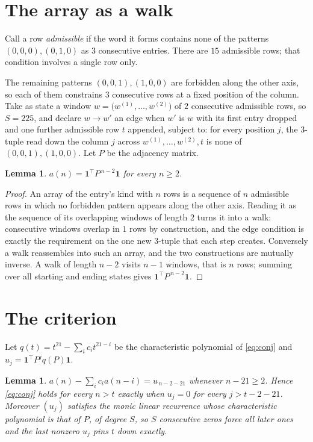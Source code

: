 \documentclass[11pt,a4paper]{article}
\theoremstyle{plain}
\newtheorem{lemma}[theorem]{Lemma}
\theoremstyle{definition}
\begin{document}
\section{The array as a walk}

Call a row \emph{admissible} if the word it forms contains none of the patterns
$(0,0,0), (0,1,0)$ as $3$ consecutive entries. There are $15$ admissible rows; that condition
involves a single row only.

The remaining patterns $(0,0,1), (1,0,0)$ are forbidden along the other axis, so each of them
constrains $3$ consecutive rows at a fixed position of the column. Take as state a
window $w=\bigl(w^{(1)},\dots,w^{(2)}\bigr)$ of $2$ consecutive admissible
rows, so $S=225$, and declare $w\to w'$ an edge when $w'$ is $w$ with its first entry
dropped and one further admissible row $t$ appended, subject to: for every position
$j$, the $3$-tuple read down the column $j$ across $w^{(1)},\dots,w^{(2)},t$
is none of $(0,0,1), (1,0,0)$. Let $P$ be the adjacency matrix.

\begin{lemma}\label{lem:walk}
$a(n)=\mathbf{1}^{\!\top}P^{\,n-2}\mathbf{1}$ for every $n\ge2$.
\end{lemma}

\begin{proof}
An array of the entry's kind with $n$ rows is a sequence of $n$ admissible rows in
which no forbidden pattern appears along the other axis. Reading it as the sequence of its
overlapping windows of length $2$ turns it into a walk: consecutive windows overlap in
$1$ rows by construction, and the edge condition is exactly the requirement on the one
new $3$-tuple that each step creates. Conversely a walk reassembles into such an array,
and the two constructions are mutually inverse. A walk of length $n-2$ visits $n-1$
windows, that is $n$ rows; summing over all starting and ending states gives
$\mathbf{1}^{\!\top}P^{\,n-2}\mathbf{1}$.
\end{proof}

\section{The criterion}

Let $q(t)=t^{21}-\sum_i c_i t^{21-i}$ be the characteristic polynomial of
\eqref{eq:conj} and $u_j=\mathbf{1}^{\!\top}P^{j}q(P)\mathbf{1}$.

\begin{lemma}\label{lem:crit}
$a(n)-\sum_i c_i a(n-i)=u_{\,n-2-21}$ whenever $n-21\ge2$. Hence
\eqref{eq:conj} holds for every $n>t$ exactly when $u_j=0$ for every
$j>t-2-21$. Moreover $(u_j)$ satisfies the monic linear recurrence whose
characteristic polynomial is that of $P$, of degree $S$, so $S$ consecutive zeros force all
later ones and the last nonzero $u_j$ pins $t$ down exactly.
\end{lemma}
\end{document}
